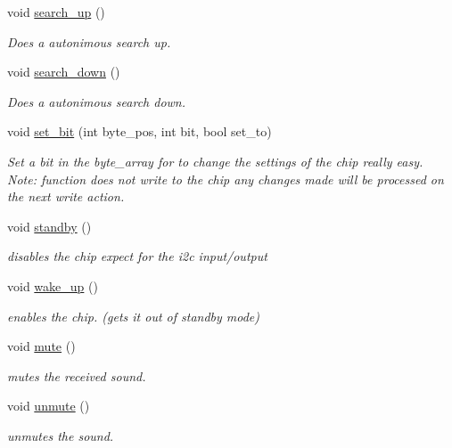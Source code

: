 \begin{DoxyCompactItemize}
void \hyperlink{classradio_receiver_adf473a64e9180683d8bcdc96fed3922c}{search\+\_\+up} ()
\begin{DoxyCompactList}\small\item\em Does a autonimous search up. \end{DoxyCompactList}\item 
void \hyperlink{classradio_receiver_a18f37c51db68873d0634519ba0cc1cae}{search\+\_\+down} ()
\begin{DoxyCompactList}\small\item\em Does a autonimous search down. \end{DoxyCompactList}\item 
void \hyperlink{classradio_receiver_a4db850d4458c556996029dcc7d432dc4}{set\+\_\+bit} (int byte\+\_\+pos, int bit, bool set\+\_\+to)
\begin{DoxyCompactList}\small\item\em Set a bit in the byte\+\_\+array for to change the settings of the chip really easy. Note\+: function does not write to the chip any changes made will be processed on the next write action. \end{DoxyCompactList}\item 
\mbox{\label{classradio_receiver_af9a0d3ce97dfb8848bdf1f0d9beeda0b}} 
void \hyperlink{classradio_receiver_af9a0d3ce97dfb8848bdf1f0d9beeda0b}{standby} ()
\begin{DoxyCompactList}\small\item\em disables the chip expect for the i2c input/output \end{DoxyCompactList}\item 
\mbox{\label{classradio_receiver_a3fbfbc241fd17d3412286f4022a19271}} 
void \hyperlink{classradio_receiver_a3fbfbc241fd17d3412286f4022a19271}{wake\+\_\+up} ()
\begin{DoxyCompactList}\small\item\em enables the chip. (gets it out of standby mode) \end{DoxyCompactList}\item 
\mbox{\label{classradio_receiver_a02a2e1d3c148f7f9bd3edfbd6b9e94ba}} 
void \hyperlink{classradio_receiver_a02a2e1d3c148f7f9bd3edfbd6b9e94ba}{mute} ()
\begin{DoxyCompactList}\small\item\em mutes the received sound. \end{DoxyCompactList}\item 
\mbox{\label{classradio_receiver_ae47250996b433dcc643e9e9116bd67cb}} 
void \hyperlink{classradio_receiver_ae47250996b433dcc643e9e9116bd67cb}{unmute} ()
\begin{DoxyCompactList}\small\item\em unmutes the sound. \end{DoxyCompactList}\end{DoxyCompactItemize}



